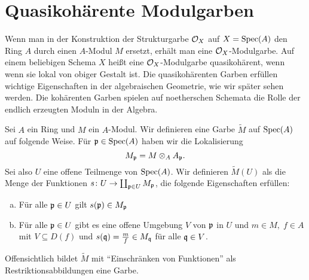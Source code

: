 

\chapter{Quasikohärente Modulgarben}
\label{chap:9}

Wenn man in der Konstruktion der Strukturgarbe $\mathcal{O}_X$ auf $X = \operatorname{Spec}(A)$ den Ring $A$ durch einen $A$-Modul $M$ ersetzt, erhält man eine $\mathcal{O}_X$-Modulgarbe. Auf einem beliebigen Schema $X$ heißt eine $\mathcal{O}_X$-Modulgarbe quasikohärent, wenn wenn sie lokal von obiger Gestalt ist. Die quasikohärenten Garben erfüllen wichtige Eigenschaften in der algebraischen Geometrie, wie wir später sehen werden. Die kohärenten Garben spielen auf noetherschen Schemata die Rolle der endlich erzeugten Moduln in der Algebra.

\begin{kons}
\label{kons:9.1}
	Sei $A$ ein Ring und $M$ ein $A$-Modul. Wir definieren eine Garbe $\widetilde{M}$ auf $\operatorname{Spec}(A)$ auf folgende Weise. Für $\mathfrak{p} \in \operatorname{Spec}(A)$ haben wir die Lokalisierung
	\[
		M_{\mathfrak{p}} = M \otimes_A A_{\mathfrak{p}}.
	\]
	Sei also $U$ eine offene Teilmenge von $\operatorname{Spec}(A)$. Wir definieren $\widetilde{M}(U)$ als die Menge der Funktionen $s \colon U \to \coprod_{\mathfrak{p} \in U} M_{\mathfrak{p}}$, die folgende Eigenschaften erfüllen:
	\begin{enumerate}[a)]
		\item Für alle $\mathfrak{p} \in U$ gilt $s(\mathfrak{p}) \in M_{\mathfrak{p}}$
		\item Für alle $\mathfrak{p} \in U$ gibt es eine offene Umgebung $V$ von $\mathfrak{p}$ in $U$ und $m\in M,\;f\in A$ mit $V \subseteq D(f)$ und $s(\mathfrak{q}) = \frac{m}{f} \in M_{\mathfrak{q}}$ für alle $\mathfrak{q} \in V$.
	\end{enumerate}
	Offensichtlich bildet $\widetilde{M}$ mit \enquote{Einschränken von Funktionen} als Restriktionsabbildungen eine Garbe.
\end{kons}

